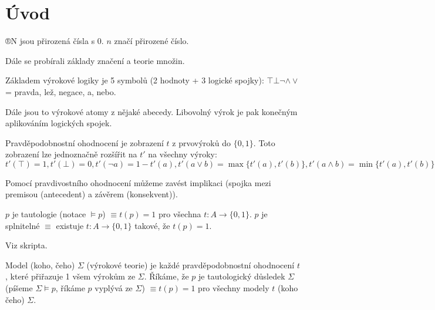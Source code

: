 \documentclass[12pt]{article}                   %
\begin{document}
\section{Úvod}
    \begin{poznamka}[Domluva]
        ®N jsou přirozená čísla s 0. $n$ značí přirozené číslo.
    \end{poznamka}

    Dále se probírali základy značení a teorie množin.


    \begin{definice}[Základy]
            Základem výrokové logiky je 5 symbolů (2 hodnoty + 3 logické spojky): $\top \bot \neg \land \lor$ = pravda, lež, negace, a, nebo.

        Dále jsou to výrokové atomy z nějaké abecedy. Libovolný výrok je pak konečným aplikováním logických spojek.
    \end{definice}

    \begin{definice}
        Pravděpodobnostní ohodnocení je zobrazení $t$ z prvovýroků do $\{0, 1\}$. Toto zobrazení lze jednoznačně rozšířit na $t'$ na všechny výroky:
        $$ t'(\top) = 1, t'(\bot) = 0, t'(\neg a) = 1 - t'(a), t'(a \lor b) = \max\{t'(a), t'(b)\}, t'(a \land b) = \min\{t'(a), t'(b)\} $$ 
    \end{definice}

    \begin{definice}
        Pomocí pravdivostního ohodnocení můžeme zavést implikaci (spojka mezi premisou (antecedent) a závěrem (konsekvent)).
    \end{definice}

    \begin{definice}[Tautologie]
        $p$ je tautologie (notace $\models p$) $≡ t(p) = 1$ pro všechna $t: A \rightarrow \{0, 1\}$. $p$ je splnitelné $≡$ existuje $t: A \rightarrow \{0, 1\}$ takové, že $t(p) = 1$.
    \end{definice}

    \begin{lemma}
        Viz skripta.
    \end{lemma}

    \begin{definice}[Model]
        Model (koho, čeho) $\Sigma$ (výrokové teorie) je každé pravděpodobnostní ohodnocení $t$, které přiřazuje 1 všem výrokům ze $\Sigma$. Říkáme, že $p$ je tautologický důsledek $\Sigma$ (píšeme $\Sigma \models p$, říkáme $p$ vyplývá ze $\Sigma$) $≡ t(p) = 1$ pro všechny modely $t$ (koho čeho) $\Sigma$.
    \end{definice}
\end{document}
